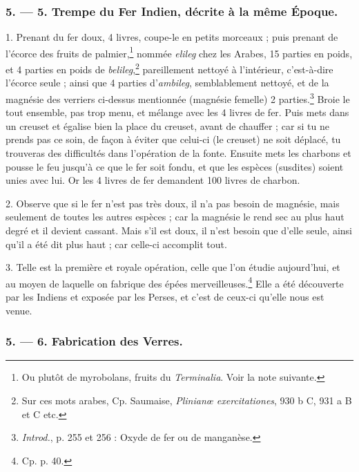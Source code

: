 \documentclass[a4paper, 11pt, oneside, polutonikogreek, french]{article}
\begin{document}
\bigskip
\centerline{\EightStarTaper}
\centerline{\EightStarTaper\EightStarTaper}
\bigskip

\subsubsection{5. --- 5. Trempe du Fer Indien, décrite à la même Époque.}

1. Prenant du fer doux, 4 livres, coupe-le en petits morceaux ; puis prenant de l'écorce des fruits de palmier,\footnote{Ou plutôt de myrobolans, fruits du \emph{Terminalia}. Voir la note suivante.} nommée \emph{elileg} chez les Arabes, 15 parties en poids, et 4 parties en poids de \emph{belileg},\footnote{Sur ces mots arabes, Cp. Saumaise, \emph{Plinianœ exercitationes}, 930 b C, 931 a B et C etc.} pareillement nettoyé à l'intérieur, c'est-à-dire l'écorce seule ; ainsi que 4 parties d'\emph{ambileg}, semblablement nettoyé, et de la magnésie des verriers ci-dessus mentionnée (magnésie femelle) 2 parties.\footnote{\emph{Introd.}, p. 255 et 256 : Oxyde de fer ou de manganèse.} Broie le tout ensemble, pas trop menu, et mélange avec les 4 livres de fer. Puis mets dans un creuset et égalise bien la place du creuset, avant de chauffer ; car si tu ne prends pas ce soin, de façon à éviter que celui-ci (le creuset) ne soit déplacé, tu trouveras des difficultés dans l'opération de la fonte. Ensuite mets les charbons et pousse le feu jusqu'à ce que le fer soit fondu, et que les espèces (susdites) soient unies avec lui. Or les 4 livres de fer demandent 100 livres de charbon.

2. Observe que si le fer n'est pas très doux, il n'a pas besoin de magnésie, mais seulement de toutes les autres espèces ; car la magnésie le rend sec au plus haut degré et il devient cassant. Mais s'il est doux, il n'est besoin que d'elle seule, ainsi qu'il a été dit plus haut ; car celle-ci accomplit tout.

3. Telle est la première et royale opération, celle que l'on étudie aujourd'hui, et au moyen de laquelle on fabrique des épées merveilleuses.\footnote{Cp. p. 40.} Elle a été découverte par les Indiens et exposée par les Perses, et c'est de ceux-ci qu'elle nous est venue.

\bigskip
\centerline{\EightStarTaper}
\centerline{\EightStarTaper\EightStarTaper}
\bigskip

\subsubsection{5. --- 6. Fabrication des Verres.}
\end{document}
